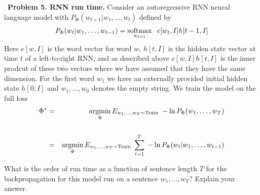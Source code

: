 \documentclass{article}
\newcommand{\solution}[1]{}
\begin{document}
\solution{When we introduce $\gamma < 1$ as in (b) the gradient update on the bottom layer is
  reduced by $\gamma^{L-2}$.  This could harm the learning along the direct connection between the
  loss and the first layer of the network.}


\bigskip
~{\bf Problem 5. RNN run time.}  Consider an autoregressive RNN neural language model with $P_\Phi(w_{t+1}|w_1,\ldots,w_t)$ defined by
$$P_\Phi(w_t| w_1,\ldots,w_{t-1}) = \operatorname*{softmax}_{w_{t+1}}\;\;e[w_t,I]h[t-1,I]$$
Here $e[w,I]$ is the word vector for word $w$, $h[t,I]$ is the hidden state vector at time $t$ of a left-to-right RNN, and as described above $e[w,I]h[t,I]$
is the inner prodcut of these two vectors where we have assumed that they have the same dimension.
For the first word $w_1$ we have an externally provided initial hidden state $h[0,I]$ and $w_1,\ldots,w_0$ denotes the empty string.
We train the model on the full loss
\begin{eqnarray*}
  \Phi^* &  = & \operatorname*{argmin}_\Phi E_{w_1,\ldots,w_T \sim \mathrm{Train}}\;-\ln P_\Phi(w_1,\ldots,w_T) \\
  \\
  & = & \operatorname*{argmin}_\Phi E_{w_1,\ldots,w_T \sim \mathrm{Train}}\;\sum_{t=1}^T\;-\ln P_\Phi(w_t|w_1,\ldots,w_{t-1})
\end{eqnarray*}

\medskip
What is the order of run time as a function of sentence length $T$ for the backpropagation for this model
run on a sentence $w_1,\ldots,w_T$?  Explain your answer.

\solution{
  The backprogation takes $O(T)$ time (not $O(T^2)$). The model consists of $O(T)$ objects each of which performs a single forward operation and a single backward operation.
  As the backpropagation procedes more of the loss terms in the sum over $t$ get incorporated.  It should be noted that RNNs take time linear in the
  sequence length even on parallel hardware.  The transformer, on the other hand, takes constant time in parallel independent of the length of the sequence.  This is
  a major advantage of the transformer.
}
\end{document}
